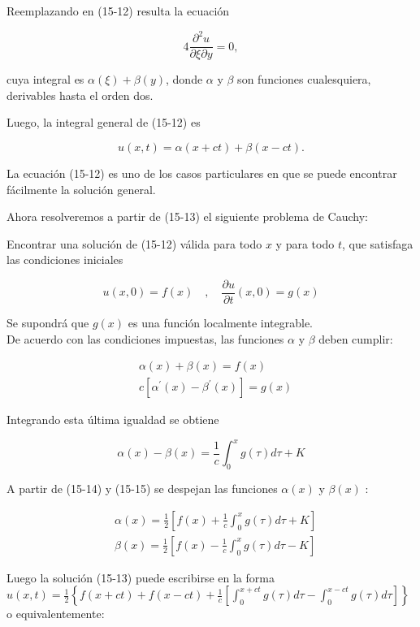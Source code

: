 \documentclass[10pt]{article}
\theoremstyle{plain}
\theoremstyle{definition}
\theoremstyle{remark}
\begin{document}
Reemplazando en (15-12) resulta la ecuación

$$
4 \frac{\partial^{2} u}{\partial \xi \partial y}=0,
$$

cuya integral es $\alpha(\xi)+\beta(y)$, donde $\alpha$ y $\beta$ son funciones cualesquiera, derivables hasta el orden dos.

Luego, la integral general de (15-12) es


\begin{equation*}
u(x, t)=\alpha(x+c t)+\beta(x-c t) . \tag{15-13}
\end{equation*}


La ecuación (15-12) es uno de los casos particulares en que se puede encontrar fácilmente la solución general.

Ahora resolveremos a partir de (15-13) el siguiente problema de Cauchy:

Encontrar una solución de (15-12) válida para todo $x$ y para todo $t$, que satisfaga las condiciones iniciales

$$
u(x, 0)=f(x) \quad, \quad \frac{\partial u}{\partial t}(x, 0)=g(x)
$$

Se supondrá que $g(x)$ es una función localmente integrable.\\
De acuerdo con las condiciones impuestas, las funciones $\alpha$ y $\beta$ deben cumplir:


\begin{align*}
& \alpha(x)+\beta(x)=f(x) \\
& c\left[\alpha^{\prime}(x)-\beta^{\prime}(x)\right]=g(x) \tag{15-14}
\end{align*}


Integrando esta última igualdad se obtiene


\begin{equation*}
\alpha(x)-\beta(x)=\frac{1}{c} \int_{0}^{x} g(\tau) d \tau+K \tag{15-15}
\end{equation*}


A partir de (15-14) y (15-15) se despejan las funciones $\alpha(x)$ y $\beta(x)$ :

$$
\begin{aligned}
& \alpha(x)=\frac{1}{2}\left[f(x)+\frac{1}{c} \int_{0}^{x} g(\tau) d \tau+K\right] \\
& \beta(x)=\frac{1}{2}\left[f(x)-\frac{1}{c} \int_{0}^{x} g(\tau) d \tau-K\right]
\end{aligned}
$$

Luego la solución (15-13) puede escribirse en la forma $u(x, t)=\frac{1}{2}\left\{f(x+c t)+f(x-c t)+\frac{1}{c}\left[\int_{0}^{x+c t} g(\tau) d \tau-\int_{0}^{x-c t} g(\tau) d \tau\right]\right\}$ o equivalentemente:
\end{document}
